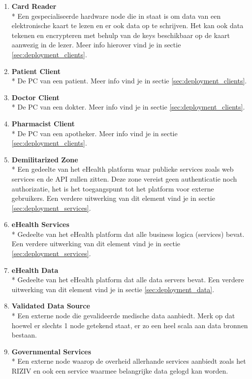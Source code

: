\documentclass[a4paper,10pt]{article}
\begin{document}
\begin{enumerate}
\item \textbf{Card Reader}\\*
Een gespecialiseerde hardware node die in staat is om data van een elektronische kaart te lezen en er ook data op te schrijven. Het kan ook data tekenen en encrypteren met behulp van de keys beschikbaar op de kaart aanwezig in de lezer. Meer info hierover vind je in sectie \ref{sec:deployment_clients}.
\item \textbf{Patient Client}\\*
De PC van een patient. Meer info vind je in sectie \ref{sec:deployment_clients}.
\item \textbf{Doctor Client}\\*
De PC van een dokter. Meer info vind je in sectie \ref{sec:deployment_clients}.
\item \textbf{Pharmacist Client}\\*
De PC van een apotheker. Meer info vind je in sectie \ref{sec:deployment_clients}.
\item \textbf{Demilitarized Zone}\\*
Een gedeelte van het eHealth platform waar publieke services zoals web services en de API zullen zitten. Deze zone vereist geen authenticatie noch authorizatie, het is het toegangspunt tot het platform voor externe gebruikers. Een verdere uitwerking van dit element vind je in sectie \ref{sec:deployment_services}.
\item \textbf{eHealth Services}\\*
Gedeelte van het eHealth platform dat alle business logica (services) bevat. Een verdere uitwerking van dit element vind je in sectie \ref{sec:deployment_services}.
\item \textbf{eHealth Data}\\*
Gedeelte van het eHealth platform dat alle data servers bevat. Een verdere uitwerking van dit element vind je in sectie \ref{sec:deployment_data}.
\item \textbf{Validated Data Source}\\*
Een externe node die gevalideerde medische data aanbiedt. Merk op dat hoewel er slechts 1 node getekend staat, er zo een heel scala aan data bronnen bestaan.
\item \textbf{Governmental Services}\\*
Een externe node waarop de overheid allerhande services aanbiedt zoals het RIZIV en ook een service waarmee belangrijke data gelogd kan worden.
\end{enumerate}
\end{document}

